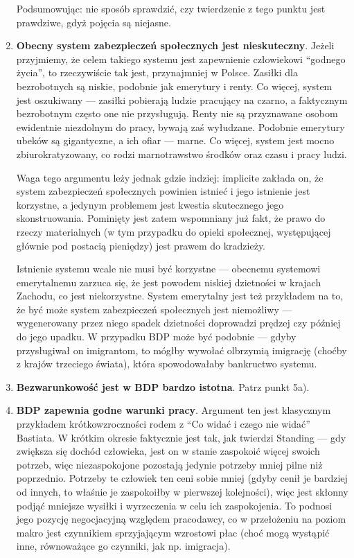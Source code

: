 \documentclass[11pt]{article}
\begin{document}
\begin{enumerate}
\begin{enumerate}[label=(\alph*)]
		\end{enumerate}
		\par Podsumowując: nie sposób sprawdzić, czy twierdzenie z tego punktu jest prawdziwe, gdyż pojęcia są niejasne.
		\item \textbf{Obecny system zabezpieczeń społecznych jest nieskuteczny}. Jeżeli przyjmiemy, że celem takiego systemu jest zapewnienie człowiekowi ``godnego życia'', to rzeczywiście tak jest, przynajmniej w Polsce. Zasiłki dla bezrobotnych są niskie, podobnie jak emerytury i renty. Co więcej, system jest oszukiwany — zasiłki pobierają ludzie pracujący na czarno, a faktycznym bezrobotnym często one nie przysługują. Renty nie są przyznawane osobom ewidentnie niezdolnym do pracy, bywają zaś wyłudzane. Podobnie emerytury ubeków są gigantyczne, a ich ofiar — marne. Co więcej, system jest mocno zbiurokratyzowany, co rodzi marnotrawstwo środków oraz czasu i pracy ludzi.
		\par Waga tego argumentu leży jednak gdzie indziej: implicite zakłada on, że system zabezpieczeń społecznych powinien istnieć i jego istnienie jest korzystne, a jedynym problemem jest kwestia skutecznego jego skonstruowania. Pominięty jest zatem wspomniany już fakt, że prawo do rzeczy materialnych (w tym przypadku do opieki społecznej, występującej głównie pod postacią pieniędzy) jest prawem do kradzieży.
		\par Istnienie systemu wcale nie musi być korzystne — obecnemu systemowi emerytalnemu zarzuca się, że jest powodem niskiej dzietności w krajach Zachodu, co jest niekorzystne. System emerytalny jest też przykładem na to, że być może system zabezpieczeń społecznych jest niemożliwy — wygenerowany przez niego spadek dzietności doprowadzi prędzej czy później do jego upadku. W przypadku BDP może być podobnie — gdyby przysługiwał on imigrantom, to mógłby wywołać olbrzymią imigrację (choćby z krajów trzeciego świata), która spowodowałaby bankructwo systemu.
		\item \textbf{Bezwarunkowość jest w BDP bardzo istotna}. Patrz punkt 5a).
		\item \textbf{BDP zapewnia godne warunki pracy}. Argument ten jest klasycznym przykładem krótkowzroczności rodem z ``Co widać i czego nie widać'' Bastiata. W krótkim okresie faktycznie jest tak, jak twierdzi Standing — gdy zwiększa się dochód człowieka, jest on w stanie zaspokoić więcej swoich potrzeb, więc niezaspokojone pozostają jedynie potrzeby mniej pilne niż poprzednio. Potrzeby te człowiek ten ceni sobie mniej (gdyby cenił je bardziej od innych, to właśnie je zaspokoiłby w pierwszej kolejności), więc jest skłonny podjąć mniejsze wysiłki i wyrzeczenia w celu ich zaspokojenia. To podnosi jego pozycję negocjacyjną względem pracodawcy, co w przełożeniu na poziom makro jest czynnikiem sprzyjającym wzrostowi płac (choć mogą wystąpić inne, równoważące go czynniki, jak np. imigracja).

\end{enumerate}
\end{document}
